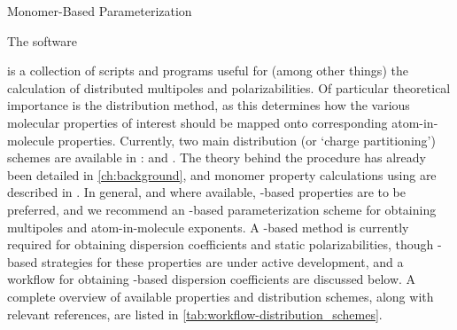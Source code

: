 \begin{section}{Monomer-Based Parameterization}
\label{sec:workflow-monomer_parameters}

\begin{subsection}{The \camcasp software}

\camcasp is a collection of scripts and programs useful for (among other
things) the calculation of distributed multipoles and
polarizabilities.\cite{camcasp5.8} Of particular theoretical importance is the
distribution method, as this determines how the various molecular properties
of interest should be mapped onto corresponding atom-in-molecule properties. Currently, two
main distribution (or `charge partitioning') schemes are available in \camcasp:
\dma\cite{Stone2005} and
\isa.\cite{Misquitta2014} The theory behind the \isa procedure has already been detailed in
\cref{ch:background}, and monomer property calculations using \dma are
described in 
. In general, and where
available, \isa-based properties are to be preferred, and we recommend an
\isa-based parameterization scheme for obtaining multipoles and
atom-in-molecule exponents. A \dma-based method is currently required for
obtaining dispersion coefficients and static polarizabilities, though
\isa-based strategies for these properties are under active development, and
a workflow for obtaining
\isa-based dispersion coefficients are discussed below. A complete overview of
available properties and distribution schemes, along with relevant references,
are listed in \cref{tab:workflow-distribution_schemes}.



\end{subsection}
\end{section}
